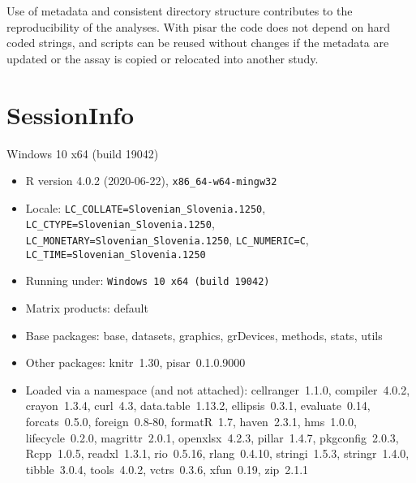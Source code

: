 \documentclass[a4paper,12pt]{article}\usepackage[]{graphicx}\usepackage[]{color}
\providecommand{\strong}[1]{{\normalfont\fontseries{b}\selectfont  #1}}
\let\pkg=\strong
\begin{document}
Use of metadata and consistent directory structure contributes to the  reproducibility of the analyses. With \pkg{pisar} the code does not depend on hard coded strings, and scripts can be reused without changes if the metadata are updated or the assay is copied or relocated into another study.




%
%

%

\clearpage
\section*{SessionInfo}
Windows 10 x64 (build 19042) 
\begin{itemize}\raggedright
  \item R version 4.0.2 (2020-06-22), \verb|x86_64-w64-mingw32|
  \item Locale: \verb|LC_COLLATE=Slovenian_Slovenia.1250|, \verb|LC_CTYPE=Slovenian_Slovenia.1250|, \verb|LC_MONETARY=Slovenian_Slovenia.1250|, \verb|LC_NUMERIC=C|, \verb|LC_TIME=Slovenian_Slovenia.1250|
  \item Running under: \verb|Windows 10 x64 (build 19042)|
  \item Matrix products: default
  \item Base packages: base, datasets, graphics, grDevices,
    methods, stats, utils
  \item Other packages: knitr~1.30, pisar~0.1.0.9000
  \item Loaded via a namespace (and not attached):
    cellranger~1.1.0, compiler~4.0.2, crayon~1.3.4, curl~4.3,
    data.table~1.13.2, ellipsis~0.3.1, evaluate~0.14,
    forcats~0.5.0, foreign~0.8-80, formatR~1.7, haven~2.3.1,
    hms~1.0.0, lifecycle~0.2.0, magrittr~2.0.1,
    openxlsx~4.2.3, pillar~1.4.7, pkgconfig~2.0.3, Rcpp~1.0.5,
    readxl~1.3.1, rio~0.5.16, rlang~0.4.10, stringi~1.5.3,
    stringr~1.4.0, tibble~3.0.4, tools~4.0.2, vctrs~0.3.6,
    xfun~0.19, zip~2.1.1
\end{itemize}
\end{document}
